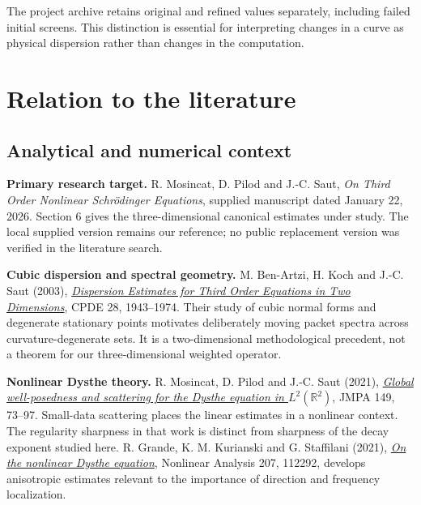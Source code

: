 \documentclass[10pt,letterpaper]{article}
\numberwithin{equation}{section}
\begin{document}
The project archive retains original and refined values separately, including
failed initial screens. This distinction is essential for interpreting changes
in a curve as physical dispersion rather than changes in the computation.

\section{Relation to the literature}

\subsection{Analytical and numerical context}\label{literature}
\textbf{Primary research target.} R. Mosincat, D. Pilod and J.-C. Saut,
\emph{On Third Order Nonlinear Schr\"odinger Equations}, supplied manuscript dated
January 22, 2026. Section 6 gives the three-dimensional canonical estimates under
study. The local supplied version remains our reference; no public replacement
version was verified in the literature search.

\textbf{Cubic dispersion and spectral geometry.} M. Ben-Artzi, H. Koch and
J.-C. Saut (2003), \href{https://doi.org/10.1081/PDE-120025491}{\emph{Dispersion Estimates
for Third Order Equations in Two Dimensions}}, CPDE 28, 1943--1974. Their study of
cubic normal forms and degenerate stationary points motivates deliberately moving
packet spectra across curvature-degenerate sets. It is a two-dimensional methodological
precedent, not a theorem for our three-dimensional weighted operator.

\textbf{Nonlinear Dysthe theory.} R. Mosincat, D. Pilod and J.-C. Saut (2021),
\href{https://arxiv.org/abs/2007.01613}{\emph{Global well-posedness and scattering for
the Dysthe equation in $L^2(\mathbb R^2)$}}, JMPA 149, 73--97. Small-data scattering
places the linear estimates in a nonlinear context. The regularity sharpness in
that work is distinct from sharpness of the decay exponent studied here.
R. Grande, K. M. Kurianski and G. Staffilani (2021),
\href{https://arxiv.org/abs/2006.13392}{\emph{On the nonlinear Dysthe equation}},
Nonlinear Analysis 207, 112292, develops anisotropic estimates relevant to the
importance of direction and frequency localization.
\end{document}
